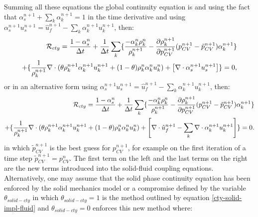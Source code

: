 Summing all these equations the global continuity equation is and using the fact that $ \alpha_s^{n+1}+\sum_k\alpha_k^{n+1}=1$ in the time 
derivative and using $\alpha_s^{n+1} u_s^{n+1}=\hat u_f^{n+1} - \sum_k\alpha_k^{n+1} u_k^{n+1}$, then: 
\begin{eqnarray}
{\cal{R}}_{cty} =\frac{1-\alpha_s^n}{\Delta t} + 
\frac{1}{\Delta t} \sum_k\{ 
\frac{  - \alpha_k^n\rho_k^{n}} {\rho_k^{n+1}} 
-  \frac{\partial \rho_k^{n+1}}{\partial p_{CV}^{n+1}} (p_{CV}^{n+1}-\tilde{p}_{CV}^{n+1}) \alpha_k^{n+1} \}
\\
+ 
\{ 
\frac{1}{\rho_k^{n+1} } \nabla\cdot (\theta \rho_k^{n+1} \alpha_k^{n+1} u_k^{n+1}+(1-\theta) \rho_k^{n} \alpha_k^{n} u_k^{n}) 
+\left[ \nabla\cdot\alpha_s^{n+1} u_s^{n+1} \right] \} 
=0, 
\end{eqnarray} 
or in an alternative form using $\alpha_s^{n+1} u_s^{n+1}=\hat u_f^{n+1} - \sum_k\alpha_k^{n+1} u_k^{n+1}$, then:
\begin{eqnarray}
{\cal{R}}_{cty} =\frac{1-\alpha_s^n}{\Delta t} + 
\frac{1}{\Delta t} \sum_k\{ 
\frac{  - \alpha_k^n\rho_k^{n}} {\rho_k^{n+1}} 
-  \frac{\partial \rho_k^{n+1}}{\partial p_{CV}^{n+1}} (p_{CV}^{n+1}-\tilde{p}_{CV}^{n+1}) \alpha_k^{n+1} \}
\\
+ 
\{ 
\frac{1}{\rho_k^{n+1} } \nabla\cdot (\theta \rho_k^{n+1} \alpha_k^{n+1} u_k^{n+1}+(1-\theta) \rho_k^{n} \alpha_k^{n} u_k^{n}) 
+\left[ \nabla\cdot\hat u_f^{n+1} - \sum_k \nabla\cdot \alpha_k^{n+1} u_k^{n+1} \right] \} 
=0. 
\label{cty-solid-impl-fluid} 
\end{eqnarray} 
in which $\tilde{p}_{CV}^{n+1}$ is the best guess for ${p}_{CV}^{n+1}$, for example on the first iteration of a 
time step  $\tilde{p}_{CV}^{n+1} ={p}_{CV}^{n}$. 
The first term on the left and the last terms on the right are the new terms introduced into the solid-fluid coupling equations. 
Alternatively, one may assume that the solid phase continuity equation   has been enforced 
by the solid mechanics model or a compromise defined by the variable $\theta_{solid-cty}$ in which 
$\theta_{solid-cty}=1$ is the method outlined by equation \ref{cty-solid-impl-fluid} and $\theta_{solid-cty}=0$ 
enforces this new method where:

